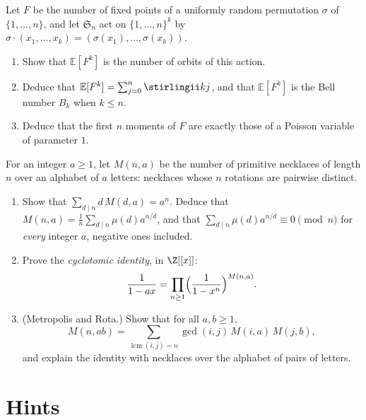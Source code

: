 \begin{exercise}[$\star\star$]\label{pb:fixmoments}
Let $F$ be the number of fixed points of a uniformly random permutation $\sigma$ of $\{1,\dots,n\}$, and let $\mathfrak S_n$
act on $\{1,\dots,n\}^k$ by $\sigma\cdot(x_1,\dots,x_k)=(\sigma(x_1),\dots,\sigma(x_k))$.
\begin{enumerate}[label=(\alph*)]
\item Show that $\mathbb E[F^k]$ is the number of orbits of this action.
\item Deduce that $\mathbb E[F^k]=\sum_{j=0}^n\stirlingii kj$, and that $\mathbb E[F^k]$ is the Bell number $B_k$ when $k\le n$.
\item Deduce that the first $n$ moments of $F$ are exactly those of a Poisson variable of parameter $1$.
\end{enumerate}
\end{exercise}

\begin{exercise}[$\star\star$]\label{pb:necklacering}
For an integer $a\ge1$, let $M(n,a)$ be the number of primitive necklaces of length $n$ over an alphabet of $a$ letters:
necklaces whose $n$ rotations are pairwise distinct.
\begin{enumerate}[label=(\alph*)]
\item Show that $\sum_{d\mid n}d\,M(d,a)=a^n$. Deduce that $M(n,a)=\frac1n\sum_{d\mid n}\mu(d)a^{n/d}$, and that
$\sum_{d\mid n}\mu(d)a^{n/d}\equiv0\pmod n$ for \emph{every} integer $a$, negative ones included.
\item Prove the \emph{cyclotomic identity}, in $\Z[[x]]$:
\[
\frac1{1-ax}=\prod_{n\ge1}\Bigl(\frac1{1-x^n}\Bigr)^{M(n,a)}.
\]
\item (Metropolis and Rota.) Show that for all $a,b\ge1$,
\[
M(n,ab)=\sum_{\operatorname{lcm}(i,j)=n}\gcd(i,j)\,M(i,a)\,M(j,b),
\]
and explain the identity with necklaces over the alphabet of pairs of letters.
\end{enumerate}
\end{exercise}

\section{Hints}

